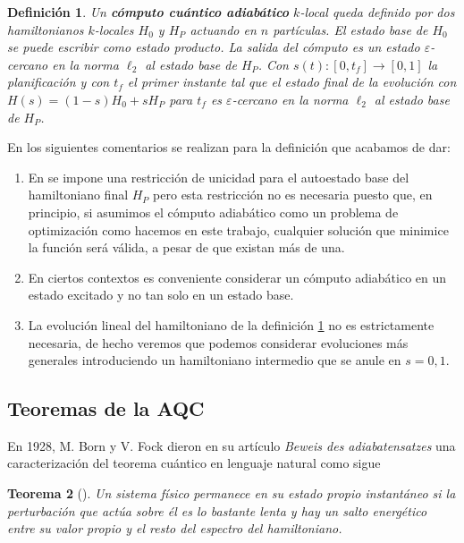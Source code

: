\documentclass[11pt, spanish]{report}
\numberwithin{equation}{section}
\newtheorem{defin}{Definición}[section]
\newtheorem{teo}[defin]{Teorema}
\numberwithin{defin}{section}
\begin{document}
\begin{appendices}
\begin{defin}\label{hola}Un \textbf{cómputo cuántico adiabático} $k$-local queda definido por dos hamiltonianos $k$-locales $H_0$ y $H_P$ actuando en $n$ partículas. El estado base de $H_0$ se puede escribir como estado producto. La salida del cómputo es un estado $\varepsilon$-cercano en la norma $\ell_2$ al estado base de $H_P$. Con $s(t):[0,t_f]\rightarrow[0,1]$ la \emph{planificación} y con $t_f$ el primer instante tal que el estado final de la evolución con $H(s)=(1-s)H_0+sH_P$ para $t_f$ es $\varepsilon$-cercano en la norma $\ell_2$ al estado base de $H_P$.
\end{defin}

En \cite{2018RvMP...90a5002A} los siguientes comentarios se realizan para la definición que acabamos de dar:

\begin{enumerate}
\item En \cite{APOLLONI1989233} se impone una restricción de unicidad para el autoestado base del hamiltoniano final $H_P$ pero esta restricción no es necesaria puesto que, en principio, si asumimos el cómputo adiabático como un problema de optimización como hacemos en este trabajo, cualquier solución que minimice la función será válida, a pesar de que existan más de una.

\item En ciertos contextos es conveniente considerar un cómputo adiabático en un estado excitado y no tan solo en un estado base.

\item La evolución lineal del hamiltoniano de la definición \ref{hola} no es estrictamente necesaria, de hecho veremos que podemos considerar evoluciones más generales introduciendo un hamiltoniano intermedio que se anule en $s=0,1$.
\end{enumerate}

\subsection{Teoremas de la AQC}

En 1928, M. Born y V. Fock dieron en su artículo \textit{Beweis des adiabatensatzes} una caracterización del teorema cuántico en lenguaje natural como sigue\\

\begin{teo}[\cite{Born1928}] Un sistema físico permanece en su estado propio instantáneo si la perturbación que actúa sobre él es lo bastante lenta y hay un salto energético entre su valor propio y el resto del espectro del hamiltoniano.
\end{teo}


\end{appendices}
\end{document}
